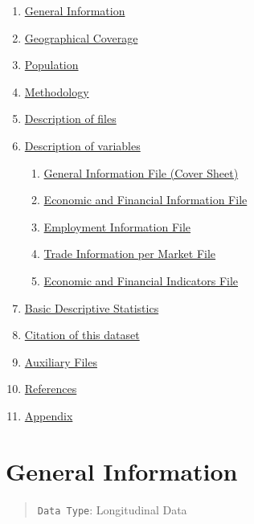 \documentclass[]{book}
\providecommand{\tightlist}{%
  \setlength{\itemsep}{0pt}\setlength{\parskip}{0pt}}
\begin{document}
\begin{enumerate}
\def\labelenumi{\arabic{enumi}.}
\tightlist
\item
  \protect\hyperlink{general-information}{General Information}
\item
  \protect\hyperlink{geographical-coverage}{Geographical Coverage}
\item
  \protect\hyperlink{population}{Population}
\item
  \protect\hyperlink{methodology}{Methodology}
\item
  \protect\hyperlink{description-of-files}{Description of files}
\item
  \protect\hyperlink{description-of-variables}{Description of variables}

  \begin{enumerate}
  \def\labelenumii{\arabic{enumii}.}
  \tightlist
  \item
    \protect\hyperlink{a.-general-information-file-cover-sheet}{General Information File (Cover Sheet)}
  \item
    \protect\hyperlink{b.-economic-and-financial-information-file}{Economic and Financial Information File}
  \item
    \protect\hyperlink{c.-employment-information-file}{Employment Information File}
  \item
    \protect\hyperlink{d.-trade-information-per-market-file}{Trade Information per Market File}
  \item
    \protect\hyperlink{e.-economic-and-financial-indicators}{Economic and Financial Indicators File}
  \end{enumerate}
\item
  \protect\hyperlink{basic-descriptive-statistics}{Basic Descriptive Statistics}
\item
  \protect\hyperlink{citation-of-this-dataset}{Citation of this dataset}
\item
  \protect\hyperlink{auxiliary-files}{Auxiliary Files}
\item
  \protect\hyperlink{references}{References}
\item
  \protect\hyperlink{appendix}{Appendix}
\end{enumerate}

\hypertarget{general-information}{%
\chapter{General Information}\label{general-information}}

\begin{quote}
\texttt{Data\ Type}: Longitudinal Data
\end{quote}
\end{document}

